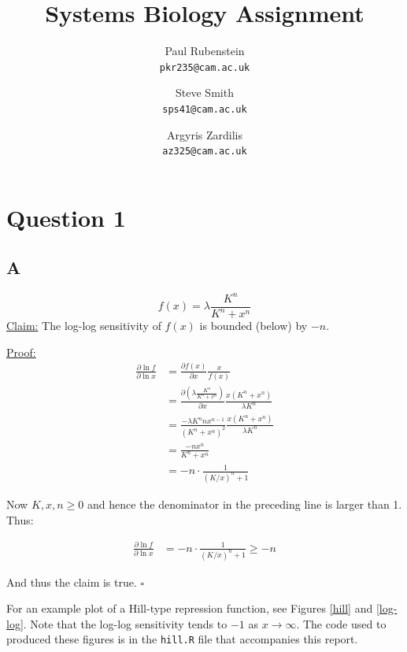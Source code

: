 \documentclass[a4paper,12pt]{article}
\author{Paul Rubenstein\\ \texttt{pkr235@cam.ac.uk} \and Steve Smith \\ \texttt{sps41@cam.ac.uk} \and Argyris Zardilis \\ \texttt{az325@cam.ac.uk}}
\title{Systems Biology Assignment}
\begin{document}
\maketitle

\section*{Question 1}
\subsection*{A}
\[f(x) = \lambda \frac{K^n}{K^n + x^n}\]
\underline{Claim:} The log-log sensitivity of $f(x)$ is bounded (below) by $-n$.

\noindent \underline{Proof:} 
\begin{align*}
\frac{\partial \ln f}{\partial \ln x} & =  \frac{\partial f(x)}{\partial x}\frac{x}{f(x)} \\
& = \frac{\partial (\lambda \frac{K^n}{K^n + x^n})}{\partial x} \frac{x(K^n + x^n)}{\lambda K^n} \\
& = \frac{- \lambda K^n n x^{n-1}}{(K^n + x^n)^2} \frac{x(K^n + x^n)}{\lambda K^n} \\
& = \frac{-n x^n}{K^n + x^n}\\
& = -n \cdot \frac{1}{(K/x)^n+1}
\end{align*}

Now $K, x, n \geq 0$ and hence the denominator in the preceding line is larger than 1. Thus:

\begin{align*}
\frac{\partial \ln f}{\partial \ln x} & = -n \cdot \frac{1}{(K/x)^n+1} \geq -n
\end{align*}

And thus the claim is true. $\square$

For an example plot of a Hill-type repression function, see Figures \ref{hill} and \ref{log-log}. Note that the log-log sensitivity tends to $-1$ as $x\longrightarrow \infty$. The code used to produced these figures is in the \texttt{hill.R} file that accompanies this report.
\end{document}
